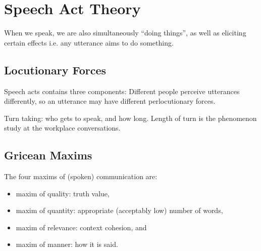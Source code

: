 \documentclass[../main.tex]{subfiles}
\begin{document}
    \section{Speech Act Theory}

    \begin{preamb}
        When we speak, we are also simultaneously ``doing things'', as well as eliciting certain effects i.e. any utterance aims to do something.
    \end{preamb}

    \subsection{Locutionary Forces}
    Speech acts contains three components: 
    Different people perceive utterances differently, so an utterance may have different perlocutionary forces.


    Turn taking: who gets to speak, and how long. Length of turn is the phenomenon study at the workplace conversations.

	\subsection{Gricean Maxims}
	The four maxims of (spoken) communication are: \begin{itemize}
			\item maxim of quality: truth value,
			\item maxim of quantity: appropriate (acceptably low) number of words,
			\item maxim of relevance: context cohesion, and
			\item maxim of manner: how it is said.
	\end{itemize}
\end{document}
